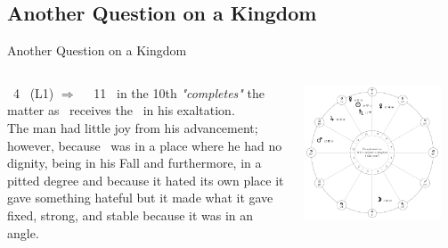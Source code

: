 \subsection{Another Question on a Kingdom}
\begin{frame}[t]{Another Question on a Kingdom}
\begin{columns}[T, onlytextwidth]
\Moon\ 4 \Libra\ (L1) $\Rightarrow$ \Opposition\ \Saturn\ 11 \Aries\ in the 10th \textsl{"completes"} the matter as \Saturn\ receives the \Moon\ in his exaltation. \\
\vspace{0.5cm}
The man had little joy from his advancement; however, because \Saturn\ was in a place where he had no dignity, being in his Fall and furthermore, in a pitted degree and because it hated its own place it gave something hateful but it made what it gave fixed, strong, and stable because it was in an angle.
 
\begin{center}
{\includegraphics[width=0.9\textwidth]{charts/51-chart-kingdom}} \\
\end{center}
\end{columns}
\end{frame}